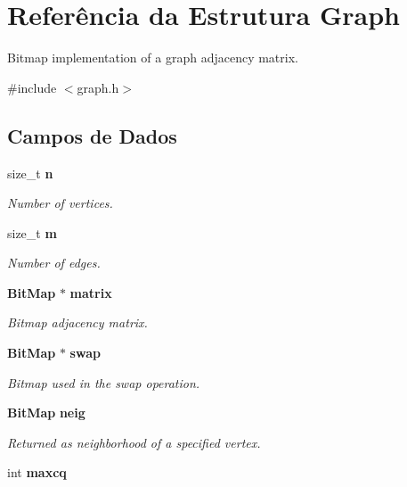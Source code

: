 \section{Referência da Estrutura Graph}
\label{structGraph}


Bitmap implementation of a graph adjacency matrix.  




{\ttfamily \#include $<$graph.\+h$>$}

\subsection*{Campos de Dados}
\begin{DoxyCompactItemize}
\item 
size\+\_\+t {\bf n}\label{structGraph_a6196749068b51bc6bd9c4b81bbf68b5b}

\begin{DoxyCompactList}\small\item\em Number of vertices. \end{DoxyCompactList}\item 
size\+\_\+t {\bf m}\label{structGraph_a6880fc5fa7af2603a45ad9b0f6f613ba}

\begin{DoxyCompactList}\small\item\em Number of edges. \end{DoxyCompactList}\item 
{\bf Bit\+Map} $\ast$ {\bf matrix}\label{structGraph_a9774d1845f2031cc38966b6515f01fe7}

\begin{DoxyCompactList}\small\item\em Bitmap adjacency matrix. \end{DoxyCompactList}\item 
{\bf Bit\+Map} $\ast$ {\bf swap}\label{structGraph_a1bf4e85e3734b658b25527434a5a7df4}

\begin{DoxyCompactList}\small\item\em Bitmap used in the swap operation. \end{DoxyCompactList}\item 
{\bf Bit\+Map} {\bf neig}\label{structGraph_ae622037be0556880d63642e46905812f}

\begin{DoxyCompactList}\small\item\em Returned as neighborhood of a specified vertex. \end{DoxyCompactList}\item 
int {\bf maxcq}\label{structGraph_af4905f210d8e490c0cce09c318462147}


\end{DoxyCompactItemize}
